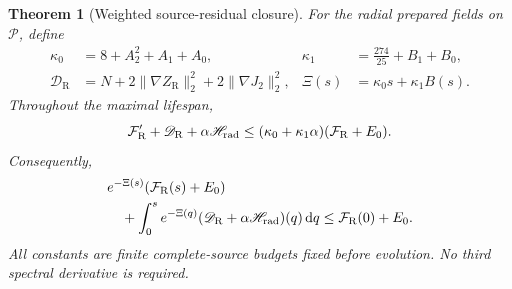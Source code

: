 \documentclass[11pt]{article}
\numberwithin{equation}{section}
\newtheorem{theorem}{Theorem}[section]
\newcommand{\dd}{\,\mathrm d}
\begin{document}
\begin{theorem}[Weighted source-residual closure]
\label{thm:weightedclosure}
For the radial prepared fields on $\mathscr P$, define
\begin{align}
 \kappa_0&=8+A_2^2+A_1+A_0,&
 \kappa_1&=\frac{274}{25}+B_1+B_0,\nonumber\\
 \mathscr D_{\mathrm R}
 &=N+2\|\nabla Z_{\mathrm R}\|_2^2
                +2\|\nabla J_2\|_2^2,&
 \Xi(s)&=\kappa_0s+\kappa_1B(s).\label{eq:weightedconstants}
\end{align}
Throughout the maximal lifespan,
\begin{equation}\label{eq:weightedclosure}
 \mathcal F_{\mathrm R}'+\mathscr D_{\mathrm R}
       +\alpha\mathscr H_{\rm rad}
 \le(\kappa_0+\kappa_1\alpha)(\mathcal F_{\mathrm R}+E_0).
\end{equation}
Consequently,
\begin{equation}\label{eq:weightedintegrated}
 \begin{split}
 &e^{-\Xi(s)}(\mathcal F_{\mathrm R}(s)+E_0)\\
 &\quad+\int_0^s e^{-\Xi(q)}
       (\mathscr D_{\mathrm R}+\alpha\mathscr H_{\rm rad})(q)\dd q
 \le\mathcal F_{\mathrm R}(0)+E_0.
 \end{split}
\end{equation}
All constants are finite complete-source budgets fixed before evolution.
No third spectral derivative is required.
\end{theorem}
\end{document}
